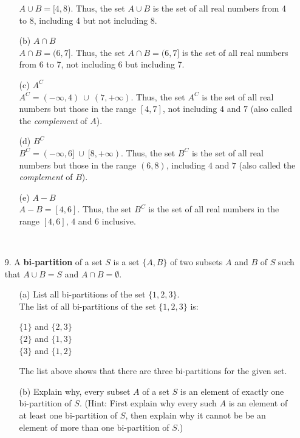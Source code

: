 \documentclass[12pt, a4paper]{article}                  %
\begin{document}
\begin{enumerate}
\begin{enumerate}
$A \cup B = [4,8)$. Thus, the set $A \cup B$ is the set of all real numbers
from 4 to 8, including 4 but not including 8.
\\
\item[(b)]
$A \cap B$\\

$A \cap B = (6,7]$. Thus, the set $A \cap B = (6,7]$ is the set of all real numbers
from 6 to 7, not including 6 but including 7.
\\
\item[(c)]
$A^C$\\

$A^C = (-\infty, 4) \ \cup \ (7, +\infty)$. Thus, the set $A^C$ is the set of all real numbers
but those in the range $[4,7]$, not including $4$ and $7$ (also called the \textit{complement} of $A$).
\\
\item[(d)]
$B^C$\\

$B^C = (-\infty, 6] \ \cup \ [8, +\infty)$. Thus, the set $B^C$ is the set of all real numbers
but those in the range $(6,8)$, including $4$ and $7$ (also called the \textit{complement} of $B$).
\\

\item[(e)]
$A - B$\\

$A - B = [4,6]$. Thus, the set $B^C$ is the set of all real numbers
in the range $[4,6]$, $4$ and $6$ inclusive.
\end{enumerate}

\

\item[9.]
A \textbf{bi-partition} of a set $S$ is a set $\{A,B\}$ of two subsets
$A$ and $B$ of $S$ such that $A \cup B = S$ and $A \cap B = \emptyset$.
\begin{enumerate}
\item[(a)]
List all bi-partitions of the set $\{1,2,3\}$.
\\

The list of all bi-partitions of the set $\{1,2,3\}$ is:
\begin{center}
$\{1\}$ and $\{2,3\}$\\
$\{2\}$ and $\{1,3\}$\\
$\{3\}$ and $\{1,2\}$\\
\end{center}
The list above shows that there are three bi-partitions for the given set.
\\
\item[(b)]
Explain why, every subset $A$ of a set $S$ is an element of exactly one bi-partition of
$S$. (Hint: First explain why every such $A$ is an element of at least one bi-partition
of $S$, then explain why it cannot be be an element of more than one bi-partition
of $S$.)
\\


\end{enumerate}
\end{enumerate}
\end{document}
